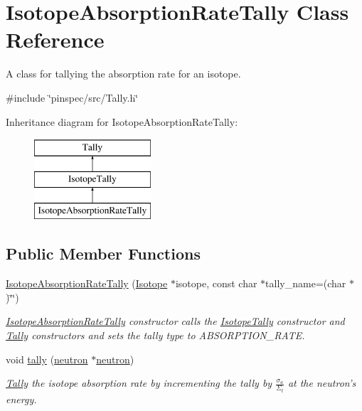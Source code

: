 \hypertarget{classIsotopeAbsorptionRateTally}{\section{Isotope\-Absorption\-Rate\-Tally Class Reference}
\label{classIsotopeAbsorptionRateTally}
}


A class for tallying the absorption rate for an isotope.  




{\ttfamily \#include \char`\"{}pinspec/src/\-Tally.\-h\char`\"{}}

Inheritance diagram for Isotope\-Absorption\-Rate\-Tally\-:\begin{figure}[H]
\begin{center}
\leavevmode
\includegraphics[height=3.000000cm]{classIsotopeAbsorptionRateTally}
\end{center}
\end{figure}
\subsection*{Public Member Functions}
\begin{DoxyCompactItemize}
\item 
\hyperlink{classIsotopeAbsorptionRateTally_a8b88ce947c31e5050a14bf458ae84230}{Isotope\-Absorption\-Rate\-Tally} (\hyperlink{classIsotope}{Isotope} $\ast$isotope, const char $\ast$tally\-\_\-name=(char $\ast$)\char`\"{}\char`\"{})
\begin{DoxyCompactList}\small\item\em \hyperlink{classIsotopeAbsorptionRateTally}{Isotope\-Absorption\-Rate\-Tally} constructor calls the \hyperlink{classIsotopeTally}{Isotope\-Tally} constructor and \hyperlink{classTally}{Tally} constructors and sets the tally type to A\-B\-S\-O\-R\-P\-T\-I\-O\-N\-\_\-\-R\-A\-T\-E. \end{DoxyCompactList}\item 
void \hyperlink{classIsotopeAbsorptionRateTally_a300abb8c8532c790d514700ed2b5e1ee}{tally} (\hyperlink{structneutron}{neutron} $\ast$\hyperlink{structneutron}{neutron})
\begin{DoxyCompactList}\small\item\em \hyperlink{classTally}{Tally} the isotope absorption rate by incrementing the tally by $ \frac{\sigma_a}{\Sigma_t} $ at the neutron's energy. \end{DoxyCompactList}\end{DoxyCompactItemize}
